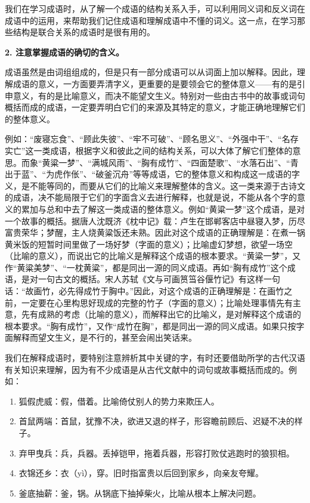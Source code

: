 我们在学习成语时，从了解一个成语的结构关系入手，可以利用同义词和反义词在成语中的运用，来帮助我们记住成语和理解成语中不懂的词义。这一点，在学习那些结构是联合关系的成语时是很有用的。

\textbf{2. 注意掌握成语的确切的含义。}

成语虽然是由词组组成的，但是只有一部分成语可以从词面上加以解释。因此，理解成语的意义，一方面要弄清字义，更重要的是要领会它的整体意义——有的是引申意义，有的是比喻意义，而决不能望文生义。特别对一些由古书中的故事或词句概括而成的成语，一定要弄明白它们的来源及其特定的意义，才能正确地理解它们的整体意义。

例如：“废寝忘食”、“顾此失彼”、“牢不可破”、“顾名思义”、“外强中干”、“名存实亡”这一类成语，根据字义和彼此之间的结构关系，可以大体了解它们整体的意思。而象“黄粱一梦”、“满城风雨”、“胸有成竹”、“四面楚歌”、“水落石出”、“青出于蓝”、“为虎作伥”、“破釜沉舟”等等成语，它的整体意义和构成这一成语的字义，是不能等同的，而要从它们的比喻义来理解整体的含义。这一类来源于古诗文的成语，决不能局限于它们的字面含义去进行解释，也就是说，不能从各个字的意义的累加与总和中去了解这一类成语的整体意义。例如“黄粱一梦”这个成语，是对一个故事的概括。据唐人沈既济《枕中记》载：卢生在邯郸客店中昼寝入梦，历尽富贵荣华；梦醒，主人烧黄粱饭还未熟。因此对这个成语的正确理解是：在煮一锅黄米饭的短暂时间里做了一场好梦（字面的意义）；比喻虚幻梦想，欲望一场空（比喻的意义），而说出它的比喻义是解释这个成语的根本要求。“黄粱一梦”，又作“黄粱美梦”、“一枕黄粱”，都是同出一源的同义成语。再如“胸有成竹”这个成语，是对一句古文的概括。宋人苏轼《文与可画筼筜谷偃竹记》有这样一句话：“故画竹，必先得成竹于胸中。”因此，对这个成语的正确理解是：在画竹之前，一定要在心里构思好现成的完整的竹子（字面的意义）；比喻处理事情先有主意，先有成熟的考虑（比喻的意义），而解释出它的比喻义，是对解释这个成语的根本要求。“胸有成竹”，又作“成竹在胸”，都是同出一源的同义成语。如果只按字面解释而望文生义，是不行的，甚至会闹出笑话来。

我们在解释成语时，要特别注意辨析其中关键的字，有时还要借助所学的古代汉语有关知识来理解，因为有不少成语是从古代文献中的词句或故事概括而成的。例如：
\begin{enumerate}
\item 狐假虎威：假，借着。比喻倚仗别人的势力来欺压人。
\item 首鼠两端：首鼠，犹豫不决，欲进又退的样子，形容瞻前顾后、迟疑不决的样子。
\item 弃甲曳兵：兵，兵器。丢掉铠甲，拖着兵器，形容打败仗逃跑时的狼狈相。
\item 衣锦还乡：衣（yì），穿。旧时指富贵以后回到家乡，向亲友夸耀。
\item 釜底抽薪：釜，锅。从锅底下抽掉柴火，比喻从根本上解决问题。
\end{enumerate}

